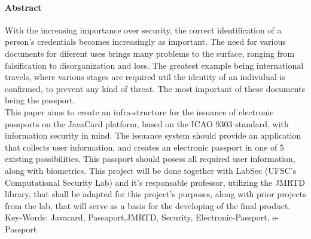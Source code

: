 \documentclass{article}
\begin{document}
	\paragraph{\large Abstract}
		\begin{justify}

			\hspace{2cm} With the increasing importance over security, the correct identification of a person's credentials becomes increasingly as important. The need for various documents for diferent uses brings many problems to the surface, ranging from falsification to disorganization and loss.
The greatest example being international travels, where various stages are required util the identity of an individual is confirmed, to prevent any kind of threat. The most important of these documents being the passport.\\
			\hspace*{2cm} 
			This paper aims to create an infra-structure for the issuance of electronic passports on the JavaCard platform, based on the ICAO 9303 standard, with information security in mind. The issuance system should provide an application that collects user information, and creates an electronic passport in one of 5 existing possibilities. This passport should posess all required user information, along with biometrics. This project will be done together with LabSec (UFSC's Computational Security Lab) and it's responsable professor, utilizing the JMRTD library, that shall be adapted for this project's purposes, along with prior projects from the lab, that will serve as a basis for the developing of the final product.\\

	\vspace*{10px}
Key-Words: Javacard, Passaport,JMRTD, Security, Electronic-Passport, e-Passport

		\end{justify}
	
	\newpage

	\tableofcontents
	\listoffigures
	\newpage

\end{document}
